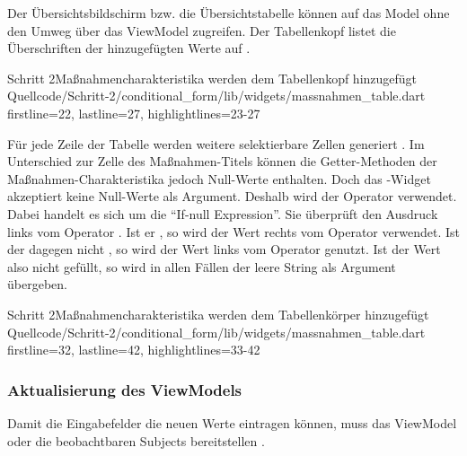 Der Übersichtsbildschirm bzw. die Übersichtstabelle können auf das Model ohne den Umweg über das ViewModel zugreifen. Der Tabellenkopf listet die Überschriften der hinzugefügten Werte auf . 

\begin{alexlisting}{Schritt 2}{Maßnahmencharakteristika werden dem Tabellenkopf hinzugefügt}
  {Quellcode/Schritt-2/conditional_form/lib/widgets/massnahmen_table.dart}
  {firstline=22, lastline=27, highlightlines={23-27}}
  \label{lst:Schritt2MassnahmencharakteristikaEerdenDemTabellenkopfHinzugefuegt}
\end{alexlisting}

Für jede Zeile der Tabelle werden weitere selektierbare Zellen generiert . Im Unterschied zur Zelle des Maßnahmen-Titels können die Getter-Methoden der Maßnahmen-Charakteristika jedoch Null-Werte enthalten.
Doch das -Widget akzeptiert keine Null-Werte als Argument. Deshalb wird der Operator  verwendet. Dabei handelt es sich um die \enquote{If-null Expression}. 
Sie überprüft den Ausdruck links vom Operator . Ist er , so wird der Wert rechts vom Operator verwendet.
Ist der dagegen nicht , so wird der Wert links vom Operator  genutzt.  Ist der Wert also nicht gefüllt, so wird in allen Fällen der leere String  als Argument übergeben.

\begin{alexlisting}{Schritt 2}{Maßnahmencharakteristika werden dem Tabellenkörper hinzugefügt}
  {Quellcode/Schritt-2/conditional_form/lib/widgets/massnahmen_table.dart}
  {firstline=32, lastline=42, highlightlines={33-42}}
  \label{lst:Schritt2MassnahmencharakteristikaWerdenDemTabellenkoerperHinzugefuegt}
\end{alexlisting}

\subsubsection{Aktualisierung des ViewModels}

Damit die Eingabefelder die neuen Werte eintragen können, muss das ViewModel oder die beobachtbaren Subjects bereitstellen .  

